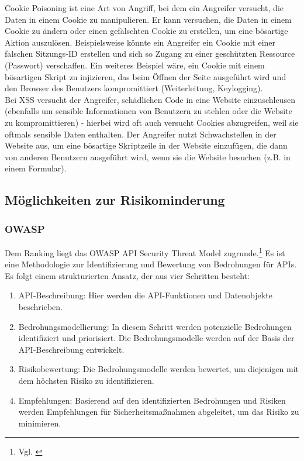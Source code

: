 \documentclass[notitlepage, hidelinks]{article}
\begin{document}
Cookie Poisoning ist eine Art von Angriff, bei dem ein Angreifer versucht, die Daten in einem Cookie zu manipulieren. Er kann versuchen, die Daten in einem Cookie zu ändern oder einen gefälschten Cookie zu erstellen, um eine bösartige Aktion auszulösen. Beispielsweise könnte ein Angreifer ein Cookie mit einer falschen Sitzungs-ID erstellen und sich so Zugang zu einer geschützten Ressource (Passwort) verschaffen. Ein weiteres Beispiel wäre, ein Cookie mit einem bösartigen Skript zu injizieren, das beim Öffnen der Seite ausgeführt wird und den Browser des Benutzers kompromittiert (Weiterleitung, Keylogging). \\

Bei XSS versucht der Angreifer, schädlichen Code in eine Website einzuschleusen (ebenfalls um sensible Informationen von Benutzern zu stehlen oder die Website zu kompromittieren) - hierbei wird oft auch versucht Cookies abzugreifen, weil sie oftmals sensible Daten enthalten. Der Angreifer nutzt Schwachstellen in der Website aus, um eine bösartige Skriptzeile in der Website einzufügen, die dann von anderen Benutzern ausgeführt wird, wenn sie die Website besuchen (z.B. in einem Formular).

\subsection{Möglichkeiten zur Risikominderung}
\subsubsection{OWASP}

Dem Ranking liegt das OWASP API Security Threat Model zugrunde.\footnote{Vgl. \cite{api-owasp}} Es ist eine Methodologie zur Identifizierung und Bewertung von Bedrohungen für APIs. Es folgt einem strukturierten Ansatz, der aus vier Schritten besteht:
\begin{enumerate}
\item API-Beschreibung: Hier werden die API-Funktionen und Datenobjekte beschrieben.
\item Bedrohungsmodellierung: In diesem Schritt werden potenzielle Bedrohungen identifiziert und priorisiert. Die Bedrohungsmodelle werden auf der Basis der API-Beschreibung entwickelt.
\item Risikobewertung: Die Bedrohungsmodelle werden bewertet, um diejenigen mit dem höchsten Risiko zu identifizieren.
\item Empfehlungen: Basierend auf den identifizierten Bedrohungen und Risiken werden Empfehlungen für Sicherheitsmaßnahmen abgeleitet, um das Risiko zu minimieren.
\end{enumerate}
\end{document}
